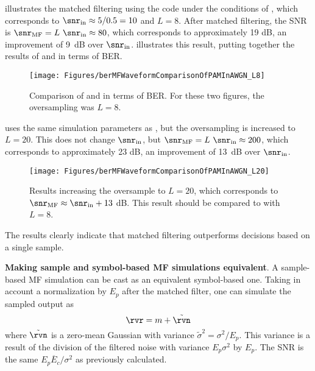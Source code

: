  illustrates the matched filtering using the code  under the conditions of , which corresponds to $\snr_\textrm{in} \approx 5/0.5 = 10$ and $L=8$. After matched filtering, the SNR is $\snr_\textrm{MF} = L \textrm{~} \snr_\textrm{in} \approx 80$, which corresponds to approximately 19 dB, an improvement of 9~dB over $\snr_\textrm{in}$.  illustrates this result, putting together the results of  and  in terms of BER. 

\begin{figure}[htbp]
\centering
\texttt{[image: Figures/berMFWaveformComparisonOfPAMInAWGN\_L8]}
\caption[{Comparison of  and  in terms of BER.}]{Comparison of  and  in terms of BER. For these two figures, the oversampling was $L=8$.\label{fig:berMFWaveformComparisonOfPAMInAWGN_L8}}
\end{figure}

 uses the same simulation parameters as , but the oversampling is increased to $L=20$. This does not change $\snr_\textrm{in}$, but $\snr_\textrm{MF} = L \textrm{~} \snr_\textrm{in} \approx 200$, which corresponds to approximately 23 dB, an improvement of 13~dB over $\snr_\textrm{in}$. 

\begin{figure}[htbp]
\centering
\texttt{[image: Figures/berMFWaveformComparisonOfPAMInAWGN\_L20]}
\caption[{Results increasing the oversample to $L=20$, which corresponds to $\snr_\textrm{MF} \approx \snr_\textrm{in} + 13$ dB.}]{Results increasing the oversample to $L=20$, which corresponds to $\snr_\textrm{MF} \approx \snr_\textrm{in} + 13$ dB. This result should be compared to  with $L=8$.\label{fig:berMFWaveformComparisonOfPAMInAWGN_L20}}
\end{figure}

The results clearly indicate that matched filtering outperforms decisions based on a single sample. 

\bExample \textbf{Making sample and symbol-based MF simulations equivalent}.
A sample-based MF simulation can be cast as an equivalent symbol-based one.
Taking in account a normalization by $E_p$ after the matched filter, one can simulate the sampled output as
\[\rvr = m + \tilde \rvn\]
where $\tilde \rvn$ is a zero-mean Gaussian with variance $\tilde \sigma^2 = \sigma^2 / E_p$. This variance is a result of the division of the filtered noise with variance $E_p \sigma^2$ by $E_p$. The SNR is the same $E_p \overline E_c / \sigma^2$ as previously calculated.

